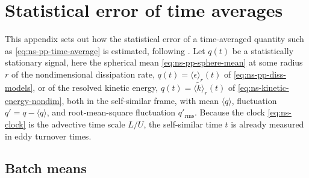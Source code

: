\documentclass{article}
\begin{document}
\section{Statistical error of time averages}\label{app:stat-error}

This appendix sets out how the statistical error of a time-averaged quantity
such as \eqref{eq:ns-pp-time-average} is estimated, following
\cite{shirian2023convergence}. Let $q(t)$ be a statistically stationary signal,
here the spherical mean \eqref{eq:ns-pp-sphere-mean} at some radius $r$ of
the nondimensional dissipation rate,
$q(t) = \langle \epsilon \rangle_r(t)$ of \eqref{eq:ns-pp-diss-models},
or of the resolved kinetic energy, $q(t) = \langle \tilde k \rangle_r(t)$ of
\eqref{eq:ns-kinetic-energy-nondim},
both in the self-similar frame, with mean $\langle q \rangle$, fluctuation
$q' = q - \langle q \rangle$, and root-mean-square fluctuation $q'_{\mathrm{rms}}$.
Because the clock \eqref{eq:ns-clock} is the advective time scale $L/U$, the
self-similar time $t$ is already measured in eddy turnover times.

\subsection{Batch means}\label{ssec:stat-batch-means}
\end{document}
